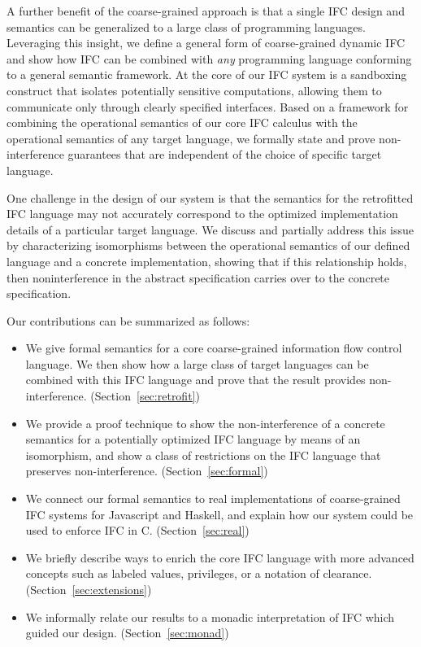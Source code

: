 A further benefit of the coarse-grained approach
is that a single IFC design and semantics can be generalized
to a large class of programming languages.
Leveraging this insight, we define a general form of coarse-grained
dynamic IFC and show how IFC can be combined with \emph{any} programming
language conforming to a general semantic framework.
At the core of our IFC system is a sandboxing construct that isolates
potentially sensitive computations, allowing them to
communicate only through clearly specified interfaces.
Based on a framework for combining the operational semantics
of our core IFC calculus with the operational semantics of any target language,
we formally state and prove non-interference guarantees that are
independent of the choice of specific target language.

One challenge in the design of our system is that the semantics for the
retrofitted IFC language may not accurately correspond to the optimized
implementation details of a particular target language.
We discuss and partially address this issue
by characterizing isomorphisms between the operational semantics of our
defined language and a concrete implementation, showing that if this
relationship holds, then noninterference in the abstract specification
carries over to the concrete specification.

Our contributions can be summarized as follows:
\begin{itemize}
  \item We give formal semantics for a core coarse-grained
  information flow control language.
  We then show how a large class of target languages can be combined
  with this IFC language and prove that the result provides
  non-interference. (Section~\ref{sec:retrofit})
  \item We provide a proof technique to show the non-interference
  of a concrete semantics for a potentially optimized IFC language
  by means of an isomorphism, and show a class of restrictions on
  the IFC language that preserves non-interference. (Section~\ref{sec:formal})
  \item We connect our formal semantics to real implementations of
  coarse-grained IFC systems for Javascript and Haskell, and explain
  how our system could be used to enforce IFC in C. (Section~\ref{sec:real})
  \item We briefly describe ways to enrich the core IFC language with
  more advanced concepts such as labeled values, privileges, or a
  notation of clearance. (Section~\ref{sec:extensions})
  \item We informally relate our results to a monadic interpretation
      of IFC which guided our design. (Section~\ref{sec:monad})     
\end{itemize}

